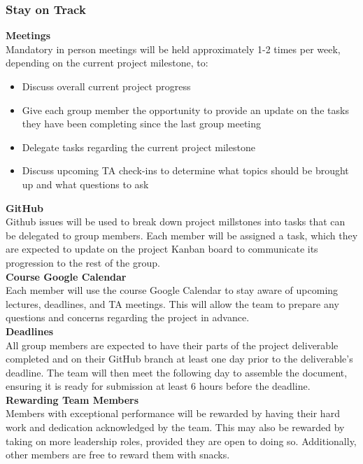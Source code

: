 \documentclass{article}
\begin{document}
\subsubsection*{Stay on Track}
\textbf{Meetings} \\
Mandatory in person meetings will be held approximately 1-2 times per week, depending on the current project milestone, to:
\begin{itemize}
    \item Discuss overall current project progress
    \item Give each group member the opportunity to provide an update on the tasks they have been completing since the last group meeting
    \item Delegate tasks regarding the current project milestone
    \item Discuss upcoming TA check-ins to determine what topics should be brought up and what questions to ask
\end{itemize}

\noindent \textbf{GitHub} \\
Github issues will be used to break down project millstones into tasks that can be delegated to group members. 
Each member will be assigned a task, which they are expected to update on the project Kanban board to communicate its progression to the rest of the group. \\

\noindent \textbf{Course Google Calendar}\\
Each member will use the course Google Calendar to stay aware of upcoming lectures, deadlines, and TA meetings. 
This will allow the team to prepare any questions and concerns regarding the project in advance. \\

\noindent \textbf{Deadlines} \\
All group members are expected to have their parts of the project deliverable completed and on their GitHub branch at least one day prior to the deliverable’s deadline. 
The team will then meet the following day to assemble the document, ensuring it is ready for submission at least 6 hours before the deadline.\\

\noindent \textbf{Rewarding Team Members} \\
Members with exceptional performance will be rewarded by having their hard work and dedication acknowledged by the team. 
This may also be rewarded by taking on more leadership roles, provided they are open to doing so. 
Additionally, other members are free to reward them with snacks. \\
\end{document}
